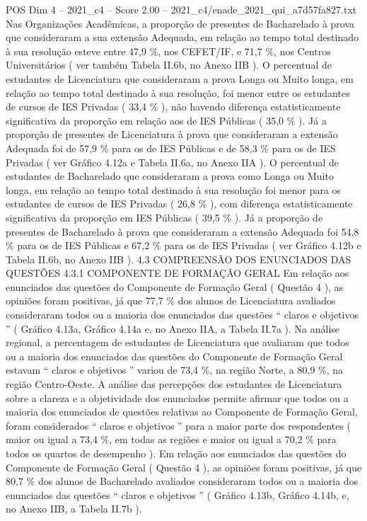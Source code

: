 \begin{textsample}{POS Dim 4 – 2021\_c4 – Score 2.00 – 2021\_c4/enade\_2021\_qui\_a7d57fa827.txt}
Nas Organizações Acadêmicas, a proporção de presentes de Bacharelado à prova que consideraram a sua extensão Adequada, em relação ao tempo total destinado à sua resolução esteve entre 47,9 \%, nos CEFET/IF, e 71,7 \%, nos Centros Universitários ( ver também Tabela II.6b, no Anexo IIB ).
O percentual de estudantes de Licenciatura que consideraram a prova Longa ou Muito longa, em relação ao tempo total destinado à sua resolução, foi menor entre os estudantes de cursos de IES Privadas ( 33,4 \% ), não havendo diferença estatisticamente significativa da proporção em relação aos de IES Públicas ( 35,0 \% ).
Já a proporção de presentes de Licenciatura à prova que consideraram a extensão Adequada foi de 57,9 \% para os de IES Públicas e de 58,3 \% para os de IES Privadas ( ver Gráfico 4.12a e Tabela II.6a, no Anexo IIA ).
O percentual de estudantes de Bacharelado que consideraram a prova como Longa ou Muito longa, em relação ao tempo total destinado à sua resolução foi menor para os estudantes de cursos de IES Privadas ( 26,8 \% ), com diferença estatisticamente significativa da proporção em IES Públicas ( 39,5 \% ).
Já a proporção de presentes de Bacharelado à prova que consideraram a extensão Adequada foi 54,8 \% para os de IES Públicas e 67,2 \% para os de IES Privadas ( ver Gráfico 4.12b e Tabela II.6b, no Anexo IIB ). 4.3 COMPREENSÃO DOS ENUNCIADOS DAS QUESTÕES 4.3.1 COMPONENTE DE FORMAÇÃO GERAL Em relação aos enunciados das questões do Componente de Formação Geral ( Questão 4 ), as opiniões foram positivas, já que 77,7 \% dos alunos de Licenciatura avaliados consideraram todos ou a maioria dos enunciados das questões “ claros e objetivos ” ( Gráfico 4.13a, Gráfico 4.14a e, no Anexo IIA, a Tabela II.7a ).
Na análise regional, a percentagem de estudantes de Licenciatura que avaliaram que todos ou a maioria dos enunciados das questões do Componente de Formação Geral estavam “ claros e objetivos ” variou de 73,4 \%, na região Norte, a 80,9 \%, na região Centro-Oeste.
A análise das percepções dos estudantes de Licenciatura sobre a clareza e a objetividade dos enunciados permite afirmar que todos ou a maioria dos enunciados de questões relativas ao Componente de Formação Geral, foram considerados “ claros e objetivos ” para a maior parte dos respondentes ( maior ou igual a 73,4 \%, em todas as regiões e maior ou igual a 70,2 \% para todos os quartos de desempenho ).
Em relação aos enunciados das questões do Componente de Formação Geral ( Questão 4 ), as opiniões foram positivas, já que 80,7 \% dos alunos de Bacharelado avaliados consideraram todos ou a maioria dos enunciados das questões “ claros e objetivos ” ( Gráfico 4.13b, Gráfico 4.14b, e, no Anexo IIB, a Tabela II.7b ).

\end{textsample}

